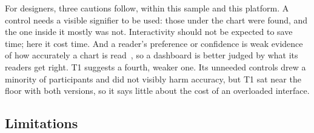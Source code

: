 \documentclass[10pt,twocolumn]{article}
\begin{document}
For designers, three cautions follow, within this sample and this platform. A control needs a visible signifier to be used: those under the chart were found, and the one inside it mostly was not. Interactivity should not be expected to save time; here it cost time. And a reader's preference or confidence is weak evidence of how accurately a chart is read~\cite{hornbaek2007}, so a dashboard is better judged by what its readers get right. T1 suggests a fourth, weaker one. Its unneeded controls drew a minority of participants and did not visibly harm accuracy, but T1 sat near the floor with both versions, so it says little about the cost of an overloaded interface.

\subsection{Limitations}
\label{sec:limitations}
\end{document}
